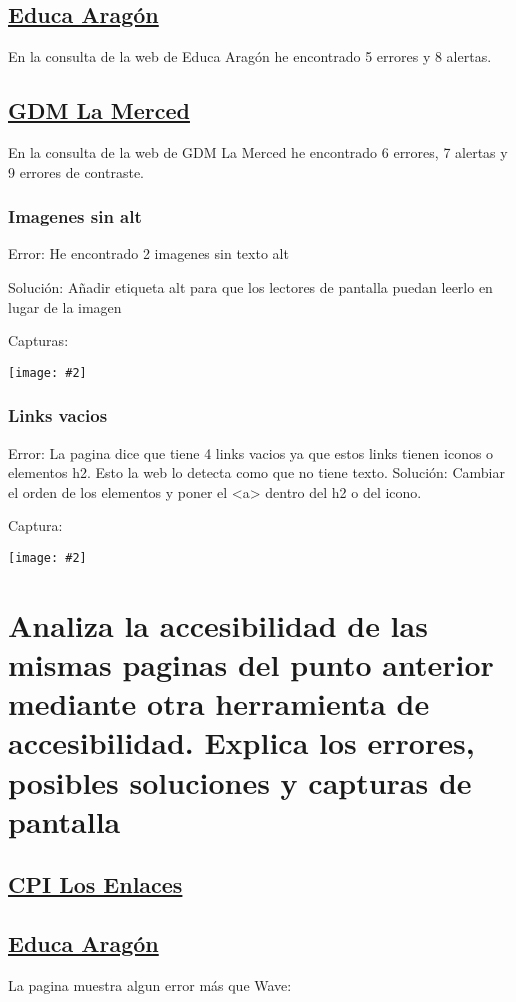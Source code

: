 \documentclass[a4paper,12pt]{article} %
\newcommand{\image}[2][1]{\texttt{[image: \#2]}}
\begin{document}
\subsection{\href{http://educa.aragon.es}{Educa Aragón}}
En la consulta de la web de Educa Aragón he encontrado 5 errores y 8 alertas.


\subsection{\href{https://gdmlamerced.com}{GDM La Merced}}
En la consulta de la web de GDM La Merced he encontrado 6 errores, 7 alertas y 9 errores de contraste.
\subsubsection{Imagenes sin alt}
Error: He encontrado 2 imagenes sin texto alt

Solución: Añadir etiqueta alt para que los lectores de pantalla puedan leerlo en lugar de la imagen

Capturas:

\image{5}

\subsubsection{Links vacios}
Error: La pagina dice que tiene 4 links vacios ya que estos links tienen iconos o elementos h2. Esto la web lo detecta como que no tiene texto.
Solución: Cambiar el orden de los elementos y poner el <a> dentro del h2 o del icono.

Captura:

\image{6}

\section{Analiza la accesibilidad de las mismas paginas del punto anterior mediante otra herramienta de accesibilidad. Explica los errores, posibles soluciones y capturas de pantalla}


\subsection{\href{http://www.cpilosenlaces.com}{CPI Los Enlaces}}


\subsection{\href{http://educa.aragon.es}{Educa Aragón}}
La pagina muestra algun error más que Wave:
\end{document}
